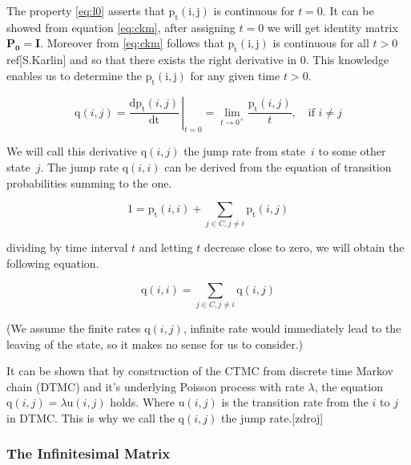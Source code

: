 \documentclass[thesis=M,english]{FITthesis}[2012/10/20]
\newcommand{\matr}[1]{\mathbf{#1}}
\begin{document}
The property \eqref{eq:l0}  asserts that $\mathrm{p_t(i,j)}$ is continuous for $t=0$. It can be showed from equation \eqref{eq:ckm}, after assigning $t=0$ we will get identity matrix $\matr{P_0} = \matr{I}$.
Moreover from \eqref{eq:ckm} follows that $\mathrm{p_t(i,j)}$ is continuous for all $t>0$ ref[S.Karlin] and so that there exists the right derivative in 0. This knowledge enables us to determine the $\mathrm{p_t(i,j)}$ for any given time $t>0$.   

\begin{equation}
\mathrm{q}(i,j) =  \left.\frac{\mathrm{d}\mathrm{p_t}(i,j)}{\mathrm{dt}} \,\right|_{t=0} = \lim_{t \to 0^+} \frac{\mathrm{p_t}(i,j)}{t}, \quad \text{if } i\neq j     
\end{equation}

We will call this derivative $\mathrm{q}(i,j)$ the jump rate from state~$i$ to some other state~$j$. The jump rate $\mathrm{q}(i,i)$ can be derived from the equation of transition probabilities summing to the one.

\begin{equation}
1 = \mathrm{p_t}(i,i) + \sum_{j \in C ,j \neq i} \mathrm{p_t}(i,j) 
\end{equation}

dividing by time interval $t$ and letting $t$ decrease close to zero, we will obtain the following equation. 

\begin{equation}\label{eq:qii}
 \mathrm{q}(i,i) =  \sum_{j \in C ,j \neq i} \mathrm{q}(i,j) 
\end{equation}

(We assume the finite rates $\mathrm{q}(i,j)$, infinite rate would immediately lead to the leaving of the state, so it makes no sense for us to consider.)

It can be shown that by construction of the CTMC from discrete time Markov chain (DTMC) and  it's underlying Poisson process with rate $\lambda$, the equation $\mathrm{q}(i,j) = \lambda\mathrm{u}(i,j)$ holds. Where $\mathrm{u}(i,j)$ is the transition rate from the $i$ to $j$ in DTMC. This is why we call the $\mathrm{q}(i,j)$ the jump rate.[zdroj]  


\subsubsection{The Infinitesimal Matrix}
\end{document}
